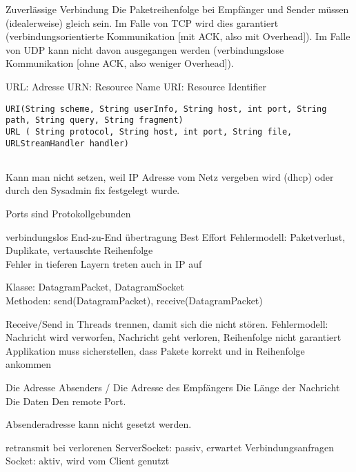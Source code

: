 \documentclass[ngerman,a4paper,12pt]{scrreprt}
\begin{document}
\ul
	\li Zuverlässige Verbindung
	\li  Die Paketreihenfolge bei Empfänger und Sender müssen (idealerweise) gleich sein.
		\ul
			\li  Im Falle von TCP wird dies garantiert
(verbindungsorientierte Kommunikation
[mit ACK, also mit Overhead]).
			\li Im Falle von UDP kann nicht davon ausgegangen werden
(verbindungslose Kommunikation
[ohne ACK, also weniger Overhead]).
		\ulE
\ulE
	
\ul
	\li URL: Adresse
	\li URN: Resource Name
	\li URI: Resource Identifier
\ulE
\begin{verbatim}
URI(String scheme, String userInfo, String host, int port, String path, String query, String fragment)
URL ( String protocol, String host, int port, String file, URLStreamHandler handler)
 
\end{verbatim}

Kann man nicht setzen, weil IP Adresse vom Netz vergeben wird (dhcp) oder durch den Sysadmin fix festgelegt wurde.

Ports sind Protokollgebunden



\ul
	\li verbindungslos
	\li End-zu-End übertragung
	\li Best Effort
	\li Fehlermodell: Paketverlust, Duplikate, vertauschte Reihenfolge \\
		Fehler in tieferen Layern treten auch in IP auf
\ulE

Klasse: DatagramPacket, DatagramSocket \\
Methoden: send(DatagramPacket), receive(DatagramPacket)

\ul
	\li Receive/Send in Threads trennen, damit sich die nicht stören.
	\li Fehlermodell: Nachricht wird verworfen, Nachricht geht verloren, Reihenfolge nicht garantiert
	\li Applikation muss sicherstellen, dass Pakete korrekt und in Reihenfolge ankommen
\ulE
{}

\ul
	\li Die Adresse Absenders / Die Adresse des Empfängers
 	\li Die Länge der Nachricht
 	\li Die Daten
 	\li Den remote Port.
\ulE

Absenderadresse kann nicht gesetzt werden.

\ul
	\li retransmit bei verlorenen
	\li ServerSocket: passiv, erwartet Verbindungsanfragen
	\li Socket: aktiv, wird vom Client genutzt
\ulE
{}
\end{document}
